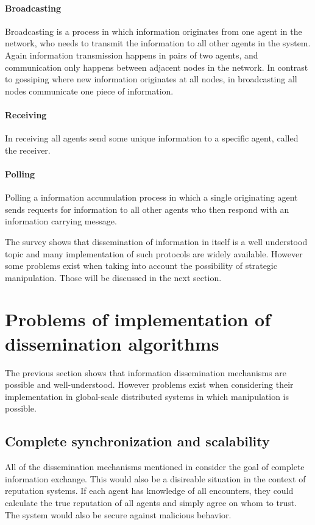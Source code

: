 \paragraph{Broadcasting} Broadcasting is a process in which information originates from one 
agent in the network, who needs to transmit the information to all other agents in the system. Again
information transmission happens in pairs of two agents, and communication only happens between 
adjacent nodes in the network. In contrast to gossiping where new information originates at all 
nodes, in broadcasting all nodes communicate one piece of information.

\paragraph{Receiving} In receiving all agents send some unique information to a specific agent, called
the receiver. 

\paragraph{Polling} Polling a information accumulation process in which a single originating agent sends requests for
information to all other agents who then respond with an information carrying message. 

The survey shows that dissemination of information in itself is a well understood topic and many 
implementation of such protocols are widely available. However some problems exist when taking into
account the possibility of strategic manipulation. Those will be discussed in the next section.

\section{Problems of implementation of dissemination algorithms}
The previous section shows that information dissemination mechanisms are possible and well-understood. However 
problems exist when considering their implementation in global-scale distributed systems in which 
manipulation is possible. 

\subsection{Complete synchronization and scalability}
All of the dissemination mechanisms mentioned in \cite{hedetniemi1988survey} consider the goal of
complete information exchange. This would also be a disireable situation in the context of reputation
systems. If each agent has knowledge of all encounters, they could calculate the true reputation of
all agents and simply agree on whom to trust. The system would also be secure against malicious 
behavior. 

